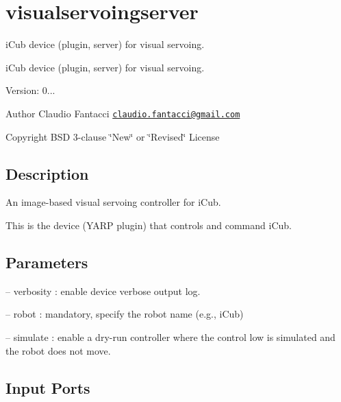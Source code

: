 \hypertarget{group__visualservoingserver}{}\section{visualservoingserver}
\label{group__visualservoingserver}


i\+Cub device (plugin, server) for visual servoing.  


i\+Cub device (plugin, server) for visual servoing. 

Version\+: 0... \begin{DoxyAuthor}{Author}
Claudio Fantacci \href{mailto:claudio.fantacci@gmail.com}{\tt claudio.\+fantacci@gmail.\+com} ~\newline
 
\end{DoxyAuthor}
\begin{DoxyCopyright}{Copyright}
B\+SD 3-\/clause \char`\"{}\+New\char`\"{} or \char`\"{}\+Revised\char`\"{} License 
\end{DoxyCopyright}
\hypertarget{group__visualservoingserver_intro_sec}{}\subsection{Description}\label{group__visualservoingserver_intro_sec}
An image-\/based visual servoing controller for i\+Cub.

This is the device (Y\+A\+RP plugin) that controls and command i\+Cub.\hypertarget{group__visualservoingserver_parameters_sec}{}\subsection{Parameters}\label{group__visualservoingserver_parameters_sec}

\begin{DoxyItemize}
\item -- verbosity \+: enable device verbose output log.
\item -- robot \+: mandatory, specify the robot name (e.\+g., i\+Cub)
\item -- simulate \+: enable a dry-\/run controller where the control low is simulated and the robot does not move. 
\end{DoxyItemize}\hypertarget{group__visualservoingserver_inputports_sec}{}\subsection{Input Ports}\label{group__visualservoingserver_inputports_sec}

